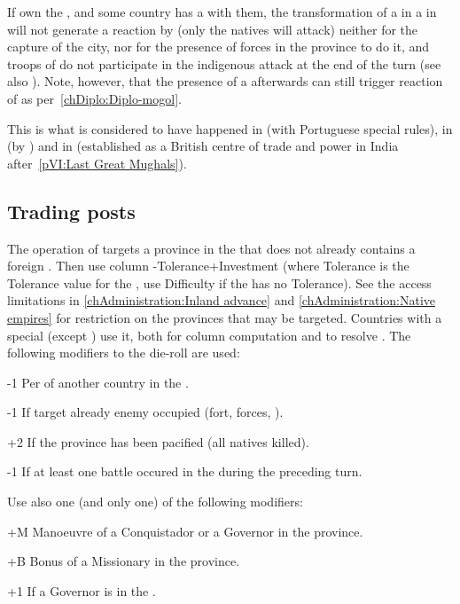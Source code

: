 \aparag[Bengal] If \paysMogol own the , and some country
has a \dipAT with them, the transformation of a \TP in a \COL in
\villeCalcutta will not generate a reaction by  (only the natives
will attack) neither for the capture of the city, nor for the presence of
forces in the province to do it, and troops of \paysMogol do not participate
in the indigenous attack at the end of the turn (see also
).
\bparag Note, however, that the presence of a \COL afterwards can still
trigger reaction of \paysMogol as per~\ref{chDiplo:Diplo-mogol}.

\begin{designnote}
  This is what is considered to have happened in \villeGoa (with Portuguese
  special rules), in \villeJakarta (by \leaderCoen) and in \villeCalcutta
  (established as a British centre of trade and power in India
  after~\ref{pVI:Last Great Mughals}).
\end{designnote}



\subsection{Trading posts}

 The operation of 
targets a province in the \ROTW that does not already contains a foreign
\COL. Then use column \FTI-Tolerance+Investment (where Tolerance is the
Tolerance value for the \Area, use Difficulty if the \Area has no Tolerance).
\bparag See the access limitations in \ref{chAdministration:Inland advance}
and \ref{chAdministration:Native empires} for restriction on the provinces
that may be targeted.
\bparag Countries with a special \FTI (except \HIS) use it, both for column
computation and to resolve \undemi.
\bparag The following modifiers to the die-roll are used:
\begin{modlist}
\item[-1]Per \TP of another country in the \Area.
\item[-1]If target already enemy occupied (fort, forces, \TP).
\item[+2]If the province has been pacified (all natives killed).
\item[-1]If at least one battle occured in the \Area during the preceding
  turn.
\end{modlist}
\bparag Use also one (and only one) of the following modifiers:
\begin{modlist}
\item[+M]Manoeuvre of a Conquistador or a Governor in the province.
\item[+B]Bonus of a Missionary in the province.
\item[+1]If a Governor is in the \Area.
\end{modlist}

